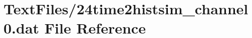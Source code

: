 \hypertarget{24time2histsim__channel0_8dat}{}\section{Text\+Files/24time2histsim\+\_\+channel0.dat File Reference}
\label{24time2histsim__channel0_8dat}
